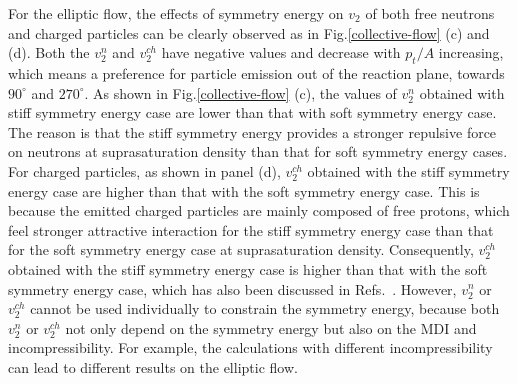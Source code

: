 \documentclass[reprint,aps,prc,twocolumn,superscriptaddress]{revtex4-1}
\begin{document}
For the elliptic flow, the effects of symmetry energy on $v_2$ of both free neutrons and charged particles can be clearly observed as in Fig.\ref{collective-flow} (c) and (d). Both the $v_2^n$ and $v_2^{ch}$ have negative values and decrease with $p_t/A$ increasing, which means a preference for particle emission out of the reaction plane, towards $90^\circ$ and $270^\circ$. As shown in Fig.\ref{collective-flow} (c), the values of $v_2^n$ obtained with stiff symmetry energy case are lower than that with soft symmetry energy case. The reason is that the stiff symmetry energy provides a stronger repulsive force on neutrons at suprasaturation density than that for soft symmetry energy cases. For charged particles, as shown in panel (d), $v_2^{ch}$ obtained with the stiff symmetry energy case are higher than that with the soft symmetry energy case. This is because the emitted charged particles are mainly composed of free protons, which feel stronger attractive interaction for the stiff symmetry energy case than that for the soft symmetry energy case at suprasaturation density. Consequently, $v_2^{ch}$ obtained with the stiff symmetry energy case is higher than that with the soft symmetry energy case, which has also been discussed in Refs.~\cite{Russotto2011PLB, Cozma2013PRC, WangYJ2014PRC,YJWang2020PLB}. However, $v_2^n$ or $v_2^{ch}$ cannot be used individually to constrain the symmetry energy, because both $v_2^n$ or $v_2^{ch}$ not only depend on the symmetry energy but also on the MDI and incompressibility. For example, the calculations with different incompressibility can lead to different results on the elliptic flow\cite{Wang2018PLB}.
\end{document}
